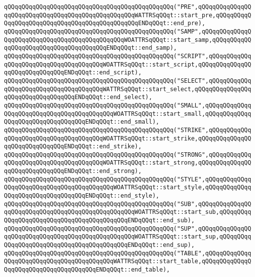 \verb|qQQqqQQqqQQqqQQqqQQqqQQqqQQqqQQqqQQqqQQqqQQqqQQq("PRE",qQQqqQQqqQQqqQQqqQQqqQQqqQQqqQQqqQQqqQQqqQQqqQQqqQQqWATTRSqQQqt::start_pre,qQQqqQQqqQQqqQQqqQQqqQQqqQQqqQQqqQQqqQQqqQQqqQQqENDqQQqt::end_pre),|\newline
\verb|qQQqqQQqqQQqqQQqqQQqqQQqqQQqqQQqqQQqqQQqqQQqqQQq("SAMP",qQQqqQQqqQQqqQQqqQQqqQQqqQQqqQQqqQQqqQQqqQQqqQQqWOATTRSqQQqt::start_samp,qQQqqQQqqQQqqQQqqQQqqQQqqQQqqQQqqQQqqQQqENDqQQqt::end_samp),|\newline
\verb|qQQqqQQqqQQqqQQqqQQqqQQqqQQqqQQqqQQqqQQqqQQqqQQq("SCRIPT",qQQqqQQqqQQqqQQqqQQqqQQqqQQqqQQqqQQqqQQqWOATTRSqQQqt::start_script,qQQqqQQqqQQqqQQqqQQqqQQqqQQqqQQqENDqQQqt::end_script),|\newline
\verb|qQQqqQQqqQQqqQQqqQQqqQQqqQQqqQQqqQQqqQQqqQQqqQQq("SELECT",qQQqqQQqqQQqqQQqqQQqqQQqqQQqqQQqqQQqqQQqWATTRSqQQqt::start_select,qQQqqQQqqQQqqQQqqQQqqQQqqQQqqQQqqQQqENDqQQqt::end_select),|\newline
\verb|qQQqqQQqqQQqqQQqqQQqqQQqqQQqqQQqqQQqqQQqqQQqqQQq("SMALL",qQQqqQQqqQQqqQQqqQQqqQQqqQQqqQQqqQQqqQQqqQQqWOATTRSqQQqt::start_small,qQQqqQQqqQQqqQQqqQQqqQQqqQQqqQQqqQQqENDqQQqt::end_small),|\newline
\verb|qQQqqQQqqQQqqQQqqQQqqQQqqQQqqQQqqQQqqQQqqQQqqQQq("STRIKE",qQQqqQQqqQQqqQQqqQQqqQQqqQQqqQQqqQQqqQQqWOATTRSqQQqt::start_strike,qQQqqQQqqQQqqQQqqQQqqQQqqQQqqQQqENDqQQqt::end_strike),|\newline
\verb|qQQqqQQqqQQqqQQqqQQqqQQqqQQqqQQqqQQqqQQqqQQqqQQq("STRONG",qQQqqQQqqQQqqQQqqQQqqQQqqQQqqQQqqQQqqQQqWOATTRSqQQqt::start_strong,qQQqqQQqqQQqqQQqqQQqqQQqqQQqqQQqENDqQQqt::end_strong),|\newline
\verb|qQQqqQQqqQQqqQQqqQQqqQQqqQQqqQQqqQQqqQQqqQQqqQQq("STYLE",qQQqqQQqqQQqqQQqqQQqqQQqqQQqqQQqqQQqqQQqqQQqWOATTRSqQQqt::start_style,qQQqqQQqqQQqqQQqqQQqqQQqqQQqqQQqqQQqENDqQQqt::end_style),|\newline
\verb|qQQqqQQqqQQqqQQqqQQqqQQqqQQqqQQqqQQqqQQqqQQqqQQq("SUB",qQQqqQQqqQQqqQQqqQQqqQQqqQQqqQQqqQQqqQQqqQQqqQQqqQQqWOATTRSqQQqt::start_sub,qQQqqQQqqQQqqQQqqQQqqQQqqQQqqQQqqQQqqQQqqQQqENDqQQqt::end_sub),|\newline
\verb|qQQqqQQqqQQqqQQqqQQqqQQqqQQqqQQqqQQqqQQqqQQqqQQq("SUP",qQQqqQQqqQQqqQQqqQQqqQQqqQQqqQQqqQQqqQQqqQQqqQQqqQQqWOATTRSqQQqt::start_sup,qQQqqQQqqQQqqQQqqQQqqQQqqQQqqQQqqQQqqQQqqQQqENDqQQqt::end_sup),|\newline
\verb|qQQqqQQqqQQqqQQqqQQqqQQqqQQqqQQqqQQqqQQqqQQqqQQq("TABLE",qQQqqQQqqQQqqQQqqQQqqQQqqQQqqQQqqQQqqQQqqQQqWATTRSqQQqt::start_table,qQQqqQQqqQQqqQQqqQQqqQQqqQQqqQQqqQQqqQQqENDqQQqt::end_table),|\newline
